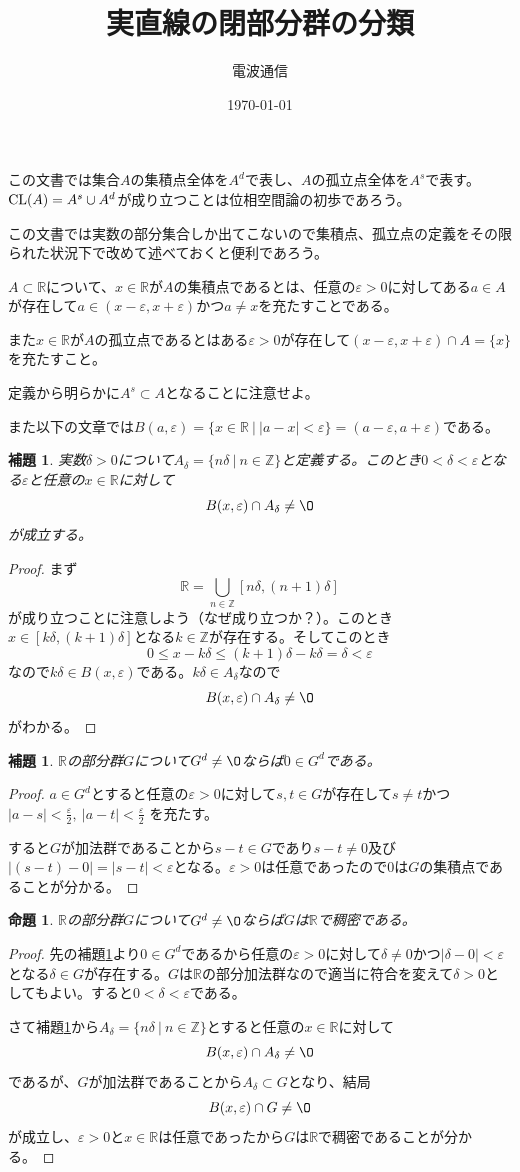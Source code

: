 \documentclass[leqno]{jsarticle}
\title{実直線の閉部分群の分類}
\author{電波通信}
\date{\today}
\newtheorem{prop}[thm]{命題}
\newtheorem{lem}[thm]{補題}
\newcommand{\zz}{\mathbb{Z}}
\newcommand{\rr}{\mathbb{R}}
\newcommand{\ep}{\varepsilon}
\newcommand{\cl}{\text{{\rm CL}}}
\begin{document}
\maketitle
この文書では集合$A$の集積点全体を$A^d$で表し、$A$の孤立点全体を$A^s$で表す。$\cl(A)=A^s\cup A^d$が成り立つことは位相空間論の初歩であろう。\par
この文書では実数の部分集合しか出てこないので集積点、孤立点の定義をその限られた状況下で改めて述べておくと便利であろう。\par
$A\subset\rr$について、$x\in \rr$が$A$の集積点であるとは、任意の$\ep>0$に対してある$a\in A$が存在して$a\in (x-\ep,x+\ep)$かつ$a\neq x$を充たすことである。\par
また$x\in \rr$が$A$の孤立点であるとはある$\ep>0$が存在して$(x-\ep,x+\ep)\cap A=\{x\}$を充たすこと。\par
定義から明らかに$A^s\subset A$となることに注意せよ。\par
また以下の文章では$B(a,\ep)=\{x\in \rr\ |\ |a-x|<\ep\}=(a-\ep,a+\ep)$である。
\begin{lem}\label{1}
実数$\delta>0$について$A_{\delta}=\{n\delta\ |\ n\in \zz\}$と定義する。このとき$0<\delta<\ep$となる$\ep$と任意の$x\in \rr$に対して
\[
B(x,\ep)\cap A_{\delta}\neq \O
\]
が成立する。
\end{lem}
\begin{proof}
まず
\[
\rr=\bigcup_{n\in \zz}[n\delta,(n+1)\delta]
\]
が成り立つことに注意しよう（なぜ成り立つか？）。このとき$x\in [k\delta,(k+1)\delta]$となる$k\in \zz$が存在する。そしてこのとき
\[
0\le x-k\delta\le(k+1)\delta-k\delta=\delta<\ep
\]
なので$k\delta\in B(x,\ep)$である。$k\delta\in A_{\delta}$なので
\[
B(x,\ep)\cap A_{\delta}\neq \O
\]
がわかる。
\end{proof}

\begin{lem}\label{2}
$\rr$の部分群$G$について$G^{d}\neq \O$ならば$0\in G^d$である。
\end{lem}
\begin{proof}
$a\in G^d$とすると任意の$\ep>0$に対して$s,t\in G$が存在して$s\neq t$かつ$|a-s|<\frac{\ep}{2},\ |a-t|<\frac{\ep}{2}$
を充たす。

すると$G$が加法群であることから$s-t\in G$であり$s-t\neq0$及び$|(s-t)-0|=|s-t|<\ep$となる。$\ep>0$は任意であったので$0$は$G$の集積点であることが分かる。
\end{proof}

\begin{prop}\label{dense}
$\rr$の部分群$G$について$G^d\neq\O$ならば$G$は$\rr$で稠密である。
\end{prop}
\begin{proof}
先の補題\ref{2}より$0\in G^d$であるから任意の$\ep>0$に対して$\delta\neq0$かつ$|\delta-0|<\ep$となる$\delta\in G$が存在する。$G$は$\rr$の部分加法群なので適当に符合を変えて$\delta>0$としてもよい。すると$0<\delta<\ep$である。\par
さて補題\ref{1}から$A_{\delta}=\{n\delta\ |\ n\in \zz\}$とすると任意の$x\in \rr$に対して
\[
B(x,\ep)\cap A_{\delta}\neq\O
\]
であるが、$G$が加法群であることから$A_{\delta}\subset G$となり、結局
\[
B(x,\ep)\cap G\neq\O
\]
が成立し、$\ep>0$と$x\in \rr$は任意であったから$G$は$\rr$で稠密であることが分かる。
\end{proof}
\end{document}
